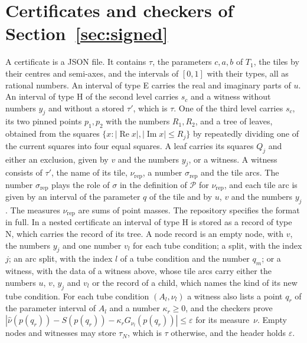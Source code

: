 \documentclass[11pt]{amsart}
\theoremstyle{definition}
\theoremstyle{remark}
\numberwithin{equation}{section}
\newcommand{\re}{\operatorname{Re}}
\newcommand{\im}{\operatorname{Im}}
\begin{document}
\section{Certificates and checkers of Section~\ref{sec:signed}}\label{app:checks}
A certificate is a JSON file. It contains $\tau$, the parameters $c,a,b$ of $T_1$, the tiles by their centres and semi-axes, and the intervals of $[0,1]$ with their types, all as rational numbers. An interval of type E carries the real and imaginary parts of $u$. An interval of type H of the second level carries $s_c$ and a witness without numbers $y_j$ and without a stored $\tau'$, which is $\tau$. One of the third level carries $s_c$, its two pinned points $p_1,p_2$ with the numbers $R_1,R_2$, and a tree of leaves, obtained from the squares $\{x:|\re x|,|\im x|\le R_j\}$ by repeatedly dividing one of the current squares into four equal squares. A leaf carries its squares $Q_j$ and either an exclusion, given by $v$ and the numbers $y_j$, or a witness. A witness consists of $\tau'$, the name of its tile, $\nu_{\mathrm{rep}}$, a number $\sigma_{\mathrm{rep}}$ and the tile arcs. The number $\sigma_{\mathrm{rep}}$ plays the role of $\sigma$ in the definition of $\mathcal P$ for $\nu_{\mathrm{rep}}$, and each tile arc is given by an interval of the parameter $q$ of the tile and by $u$, $v$ and the numbers $y_j$. The measures $\nu_{\mathrm{rep}}$ are sums of point masses. The repository specifies the format in full. In a nested certificate an interval of type H is stored as a record of type N, which carries the record of its tree. A node record is an empty node, with $v$, the numbers $y_j$ and one number $v_l$ for each tube condition; a split, with the index $j$; an arc split, with the index $l$ of a tube condition and the number $q_m$; or a witness, with the data of a witness above, whose tile arcs carry either the numbers $u$, $v$, $y_j$ and $v_l$ or the record of a child, which names the kind of its new tube condition. For each tube condition $(A_l,\nu_l)$ a witness also lists a point $q_r$ of the parameter interval of $A_l$ and a number $\kappa_r\ge0$, and the checkers prove $|\hat\nu(p(q_r))-S(p(q_r))-\kappa_rG_{\nu_l}(p(q_r))|\le\varepsilon$ for its measure~$\nu$. Empty nodes and witnesses may store $\tau_N$, which is $\tau$ otherwise, and the header holds $\varepsilon$.
\end{document}
